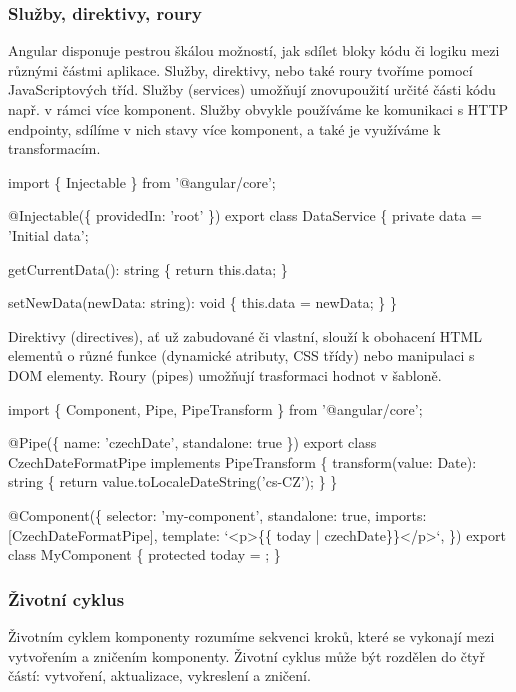 \subsubsection{Služby, direktivy, roury}

Angular disponuje pestrou škálou možností, jak sdílet bloky kódu či logiku mezi různými částmi aplikace. Služby, direktivy, nebo také roury tvoříme pomocí JavaScriptových tříd. 
Služby (services) umožňují znovupoužití určité části kódu např. v rámci více komponent. 
Služby obvykle používáme ke komunikaci s HTTP endpointy, sdílíme v nich stavy více komponent, a také je využíváme k transformacím.\cite{angulardev,learningangular}

\begin{prog}
import \{ Injectable \} from '@angular/core';
  
@Injectable(\{ providedIn: 'root' \})
export class DataService \{
  private data = 'Initial data';

  getCurrentData(): string \{
    return this.data;
  \}
      
  setNewData(newData: string): void \{
    this.data = newData;
  \}
\}
\end{prog}

Direktivy (directives), ať už zabudované či vlastní, slouží k obohacení HTML elementů o různé funkce (dynamické atributy, CSS třídy) nebo manipulaci s DOM elementy. 
Roury (pipes) umožňují trasformaci hodnot v šabloně.\cite{angulardev,angulario}

\begin{prog}
import \{ Component, Pipe, PipeTransform \} from '@angular/core';

@Pipe(\{ name: 'czechDate', standalone: true \})
export class CzechDateFormatPipe implements PipeTransform \{
  transform(value: Date): string \{
    return value.toLocaleDateString('cs-CZ');
  \}
\}

@Component(\{
  selector: 'my-component',
  standalone: true,
  imports: [CzechDateFormatPipe],
  template: `<p>\{\{ today | czechDate\}\}</p>`,
\})
export class MyComponent \{
  protected today = ;
\}
\end{prog}

\subsubsection{Životní cyklus}

Životním cyklem komponenty rozumíme sekvenci kroků, které se vykonají mezi vytvořením a zničením komponenty. 
Životní cyklus může být rozdělen do čtyř částí: vytvoření, aktualizace, vykreslení a zničení. 

